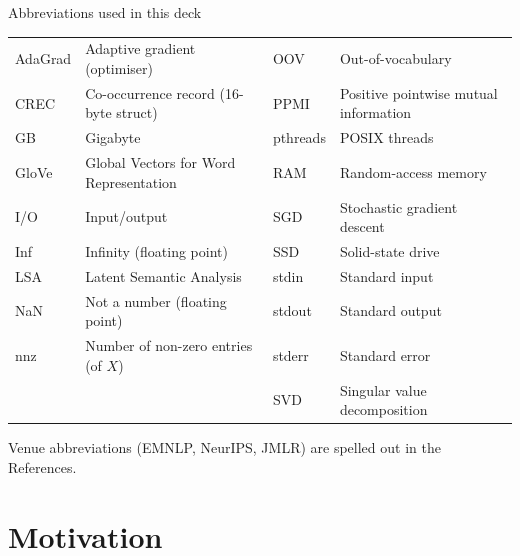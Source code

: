 \documentclass[aspectratio=169,11pt]{beamer}
\begin{document}
\begin{frame}{Abbreviations used in this deck}
\footnotesize
\centering
\begin{tabular}{@{}ll@{\hspace{10mm}}ll@{}}
\toprule
AdaGrad & Adaptive gradient (optimiser)          & OOV      & Out-of-vocabulary\\
CREC    & Co-occurrence record (16-byte struct)  & PPMI     & Positive pointwise mutual information\\
GB      & Gigabyte                               & pthreads & POSIX threads\\
GloVe   & Global Vectors for Word Representation & RAM      & Random-access memory\\
I/O     & Input/output                           & SGD      & Stochastic gradient descent\\
Inf     & Infinity (floating point)              & SSD      & Solid-state drive\\
LSA     & Latent Semantic Analysis               & stdin    & Standard input\\
NaN     & Not a number (floating point)          & stdout   & Standard output\\
nnz     & Number of non-zero entries (of $X$)    & stderr   & Standard error\\
        &                                        & SVD      & Singular value decomposition\\
\bottomrule
\end{tabular}

\vspace{3mm}
\scriptsize Venue abbreviations (EMNLP, NeurIPS, JMLR) are spelled out in the References.
\end{frame}

\section{Motivation}
\end{document}

